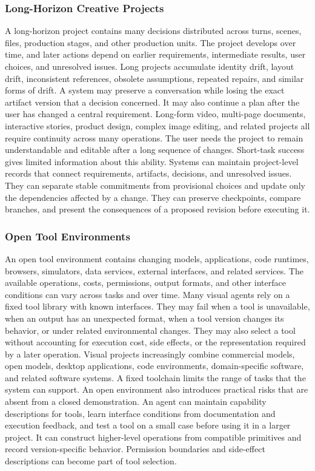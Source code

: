\subsubsection{Long-Horizon Creative Projects}

A long-horizon project contains many decisions distributed across turns, scenes, files, production stages, and other production units. The project develops over time, and later actions depend on earlier requirements, intermediate results, user choices, and unresolved issues. Long projects accumulate identity drift, layout drift, inconsistent references, obsolete assumptions, repeated repairs, and similar forms of drift. A system may preserve a conversation while losing the exact artifact version that a decision concerned. It may also continue a plan after the user has changed a central requirement. Long-form video, multi-page documents, interactive stories, product design, complex image editing, and related projects all require continuity across many operations. The user needs the project to remain understandable and editable after a long sequence of changes. Short-task success gives limited information about this ability. Systems can maintain project-level records that connect requirements, artifacts, decisions, and unresolved issues. They can separate stable commitments from provisional choices and update only the dependencies affected by a change. They can preserve checkpoints, compare branches, and present the consequences of a proposed revision before executing it.


\subsubsection{Open Tool Environments}

An open tool environment contains changing models, applications, code runtimes, browsers, simulators, data services, external interfaces, and related services. The available operations, costs, permissions, output formats, and other interface conditions can vary across tasks and over time. Many visual agents rely on a fixed tool library with known interfaces. They may fail when a tool is unavailable, when an output has an unexpected format, when a tool version changes its behavior, or under related environmental changes. They may also select a tool without accounting for execution cost, side effects, or the representation required by a later operation. Visual projects increasingly combine commercial models, open models, desktop applications, code environments, domain-specific software, and related software systems. A fixed toolchain limits the range of tasks that the system can support. An open environment also introduces practical risks that are absent from a closed demonstration. An agent can maintain capability descriptions for tools, learn interface conditions from documentation and execution feedback, and test a tool on a small case before using it in a larger project. It can construct higher-level operations from compatible primitives and record version-specific behavior. Permission boundaries and side-effect descriptions can become part of tool selection.


